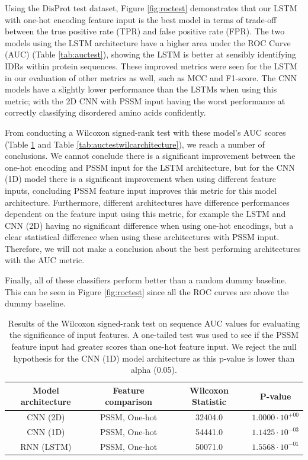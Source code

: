 \documentclass{l4proj}
\begin{document}
Using the DisProt test dataset, Figure \ref{fig:roctest} demonstrates that our LSTM with one-hot encoding feature input is the best model in terms of trade-off between the true positive rate (TPR) and false positive rate (FPR). The two models using the LSTM architecture have a higher area under the ROC Curve (AUC) (Table \ref{tab:auctest}), showing the LSTM is better at sensibly identifying IDRs within protein sequences. These improved metrics were seen for the LSTM in our evaluation of other metrics as well, such as MCC and F1-score. The CNN models have a slightly lower performance than the LSTMs when using this metric; with the 2D CNN with PSSM input having the worst performance at correctly classifying disordered amino acids confidently. 

From conducting a Wilcoxon signed-rank test with these model's AUC scores (Table \ref{tab:auctestwilcinput} and Table \ref{tab:auctestwilcarchitecture}), we reach a number of conclusions. We cannot conclude there is a significant improvement between the one-hot encoding and PSSM input for the LSTM architecture, but for the CNN (1D) model there is a significant improvement when using different feature inputs, concluding PSSM feature input improves this metric for this model architecture. Furthermore, different architectures have difference performances dependent on the feature input using this metric, for example the LSTM and CNN (2D) having no significant difference when using one-hot encodings, but a clear statistical difference when using these architectures with PSSM input. Therefore, we will not make a conclusion about the best performing architectures with the AUC metric.

Finally, all of these classifiers perform better than a random dummy baseline. This can be seen in Figure \ref{fig:roctest} since all the ROC curves are above the dummy baseline.

\begin{table}[!htb]
    \centering
    \caption{Results of the Wilcoxon signed-rank test on sequence AUC values for evaluating the significance of input features. A one-tailed test was used to see if the PSSM feature input had greater scores than one-hot feature input. We reject the null hypothesis for the CNN (1D) model architecture as this p-value is lower than alpha (0.05).}
    \begin{tabular}{@{}cccc@{}}
    \toprule
    Model architecture & Feature comparison & Wilcoxon Statistic & P-value \\ \midrule
    CNN (2D) & PSSM, One-hot & 32404.0 & $1.0000\cdot{10^{+00}}$ \\
    CNN (1D) & PSSM, One-hot & 54441.0 & $1.1425\cdot{10^{-03}}$ \\
    RNN (LSTM) & PSSM, One-hot & 50071.0 & $1.5568\cdot{10^{-01}}$ \\ \bottomrule
    \end{tabular}
    
    \label{tab:auctestwilcinput}
\end{table}
\end{document}
